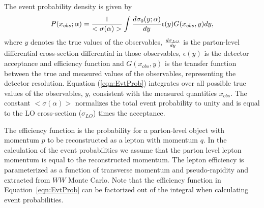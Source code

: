 The event probability density is given by
\begin{equation}
P(x_{obs};\alpha) =
 {1 \over < \sigma(\alpha) > }
 \int \frac {d \sigma_{0} (y;\alpha) }{ dy }
 \epsilon (y) G(x_{obs},y) dy,  
\label{eqn:EvtProb}  
\end{equation}
where $y$ denotes the true values of the observables,
$d \sigma_{LO} \over  dy$ is the  parton-level differential cross-section differential
in those observables, $\epsilon(y)$ is the detector acceptance and efficiency function
and $G(x_{obs},y)$ is the transfer function between the true and measured values of the
observables, representing the detector resolution.
Equation (\ref{eqn:EvtProb}) integrates over all possible true values of the
observables, $y$, consistent with the measured quantities $x_{obs}$.
The constant $<\sigma(\alpha)>$ normalizes the total event probability to unity
and is equal to the LO cross-section ($\sigma_{LO}$) times the acceptance.

The efficiency function is the probability for a parton-level object with momentum 
$p$ to be reconstructed as a lepton with momentum $q$. In the calculation of the event 
probabilities we assume that the parton level lepton momentum is equal to the reconstructed 
momentum. The lepton efficiency is parameterized as a function of transverse momentum and 
pseudo-rapidity and extracted from $WW$ Monte Carlo. 
Note that the efficiency function in Equation~\ref{eqn:EvtProb} can be factorized out of
the integral when calculating event probabilities.

